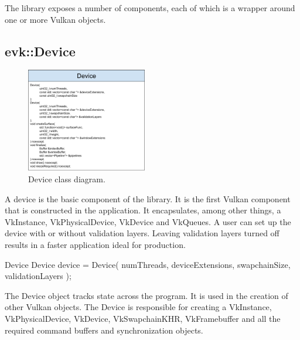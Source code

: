 \documentclass[12pt]{report}
\newcommand{\imagewidth}{0.47\textwidth}
\theoremstyle{definition}
\begin{document}
      The library exposes a number of components, each of which is a wrapper
      around one or more Vulkan objects.

      \subsection{evk::Device}

        \begin{figure}[h]
          \centering
          \includegraphics[width=\imagewidth]{images/class_device.png}
          \caption{Device class diagram.}
          \label{fig:class_device}  
        \end{figure}

        A device is the basic component of the library. It is the first Vulkan
        component that is constructed in the application. It encapsulates,
        among other things, a VkInstance, VkPhysicalDevice, VkDevice and VkQueues.
        A user can set up the device with or without validation layers. Leaving
        validation layers turned off results in a faster application ideal
        for production.

        \begin{usage}{Device}
  Device device = Device(
      numThreads, deviceExtensions, swapchainSize,
      validationLayers
  );
        \end{usage}

        The Device object tracks state across the program. It is used in the
        creation of other Vulkan objects. The Device is responsible for
        creating a VkInstance, VkPhysicalDevice, VkDevice, VkSwapchainKHR, VkFramebuffer
        and all the required command buffers and synchronization objects.\\
\end{document}
